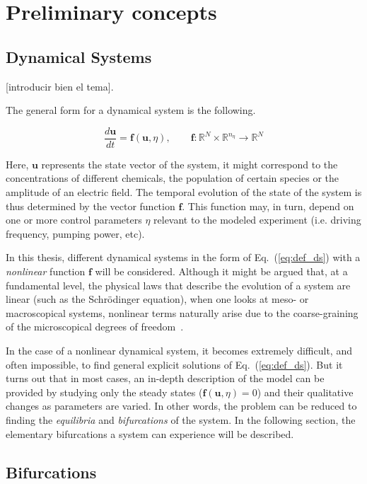 \chapter{Preliminary concepts}

\section{Dynamical Systems}

[introducir bien el tema]. 

The general form for a dynamical system is the following.

\begin{equation}
    \dfrac{d\bm{u}}{dt} = \bm{f}(\bm{u}, \eta), \qquad \bm{f} : \mathbb{R}^N \times \mathbb{R}^{n_\eta} \to \mathbb{R}^N
    \label{eq:def_ds}
\end{equation}

Here, $\bm{u}$ represents the state vector of the system, it might correspond to the
concentrations of different chemicals, the population of certain species or the amplitude
of an electric field. The temporal evolution of the state of the system is thus determined by 
the vector function $\bm{f}$. This function may, in turn, depend on one or more control
parameters $\eta$ relevant to the modeled experiment (i.e. driving frequency, pumping power, etc).

In this thesis, different dynamical systems in the form of Eq.~(\ref{eq:def_ds}) with a {\em nonlinear} function
$\bm{f}$ will be considered. Although it might be argued that, at a fundamental level, the physical laws
that describe the evolution of a system are linear (such as the Schrödinger equation), when one looks at meso- or macroscopical
systems, nonlinear terms naturally arise due to the coarse-graining of the microscopical degrees of freedom~\cite{kardar2007statistical}.


In the case of a nonlinear dynamical system, it becomes extremely difficult, and often impossible, to find
general explicit solutions of Eq.~(\ref{eq:def_ds}). But it turns out that in most cases, an in-depth
description of the model can be provided by studying only the steady states ($\bm{f}(\bm{u}, \eta) = 0$) and their qualitative changes as parameters 
are varied. In other words, the problem can be reduced to finding the {\em equilibria} and {\em bifurcations} of the system.
In the following section, the elementary bifurcations a system can experience will be described.

\section{Bifurcations}

